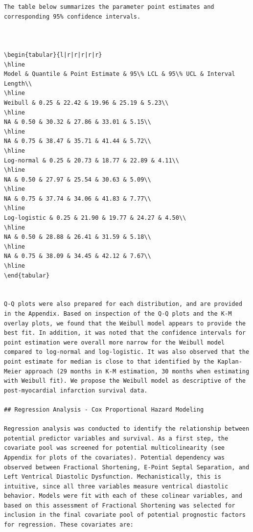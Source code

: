 \documentclass[
]{article}
\begin{document}
\begin{verbatim}
The table below summarizes the parameter point estimates and corresponding 95% confidence intervals. 



\begin{tabular}{l|r|r|r|r|r}
\hline
Model & Quantile & Point Estimate & 95\% LCL & 95\% UCL & Interval Length\\
\hline
Weibull & 0.25 & 22.42 & 19.96 & 25.19 & 5.23\\
\hline
NA & 0.50 & 30.32 & 27.86 & 33.01 & 5.15\\
\hline
NA & 0.75 & 38.47 & 35.71 & 41.44 & 5.72\\
\hline
Log-normal & 0.25 & 20.73 & 18.77 & 22.89 & 4.11\\
\hline
NA & 0.50 & 27.97 & 25.54 & 30.63 & 5.09\\
\hline
NA & 0.75 & 37.74 & 34.06 & 41.83 & 7.77\\
\hline
Log-logistic & 0.25 & 21.90 & 19.77 & 24.27 & 4.50\\
\hline
NA & 0.50 & 28.88 & 26.41 & 31.59 & 5.18\\
\hline
NA & 0.75 & 38.09 & 34.45 & 42.12 & 7.67\\
\hline
\end{tabular}


Q-Q plots were also prepared for each distribution, and are provided in the Appendix. Based on inspection of the Q-Q plots and the K-M overlay plots, we found that the Weibull model appears to provide the best fit. In addition, it was noted that the confidence intervals for point estimation were overall more narrow for the Weibull model compared to log-normal and log-logistic. It was also observed that the point estimate for median is close to that identified by the Kaplan-Meier approach (29 months in K-M estimation, 30 months when estimating with Weibull fit). We propose the Weibull model as descriptive of the post-myocardial infarction survival data.

## Regression Analysis - Cox Proportional Hazard Modeling 

Regression analysis was conducted to identify the relationship between potential predictor variables and survival. As a first step, the covariate pool was screened for potential multicolinearity (see Appendix for plots of the covariates). Potential dependency was observed between Fractional Shortening, E-Point Septal Separation, and Left Ventrical Diastolic Dysfunction. Mechanistically, this is intuitive, since all three variables measure ventrical diastolic behavior. Models were fit with each of these colinear variables, and based on this assessment of Fractional Shortening was selected for inclusion in the final covariate pool of potential prognostic factors for regression. These covariates are:  


\end{verbatim}
\end{document}
